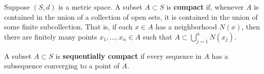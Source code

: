 Suppose $(S, d)$ is a metric space. A subset $A \subset S$ is \textbf{compact} if, whenever $A$ is contained in the union of a collection of open sets, it is contained in the union of some finite subcollection. That is, if each $x \in A$ has a neighborhood $N(x)$, then there are finitely many points $x_1, \ldots, x_n \in A$ such that $A \subset \bigcup_{j=1}^{n} N(x_j)$.

A subset $A \subset S$ is \textbf{sequentially compact} if every sequence in $A$ has a subsequence converging to a point of $A$.

